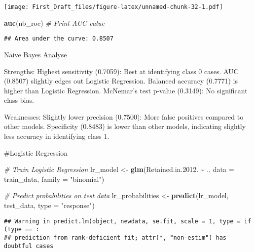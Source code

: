 \documentclass[
]{article}
\newenvironment{Shaded}{\begin{snugshade}}{\end{snugshade}}
\newcommand{\AttributeTok}[1]{\textcolor[rgb]{0.13,0.29,0.53}{#1}}
\newcommand{\CommentTok}[1]{\textcolor[rgb]{0.56,0.35,0.01}{\textit{#1}}}
\newcommand{\DecValTok}[1]{\textcolor[rgb]{0.00,0.00,0.81}{#1}}
\newcommand{\FloatTok}[1]{\textcolor[rgb]{0.00,0.00,0.81}{#1}}
\newcommand{\FunctionTok}[1]{\textcolor[rgb]{0.13,0.29,0.53}{\textbf{#1}}}
\newcommand{\NormalTok}[1]{#1}
\newcommand{\OtherTok}[1]{\textcolor[rgb]{0.56,0.35,0.01}{#1}}
\newcommand{\SpecialCharTok}[1]{\textcolor[rgb]{0.81,0.36,0.00}{\textbf{#1}}}
\newcommand{\StringTok}[1]{\textcolor[rgb]{0.31,0.60,0.02}{#1}}
\begin{document}
\texttt{[image: First\_Draft\_files/figure-latex/unnamed-chunk-32-1.pdf]}

\begin{Shaded}
\begin{Highlighting}[]
\FunctionTok{auc}\NormalTok{(nb\_roc)  }\CommentTok{\# Print AUC value}
\end{Highlighting}
\end{Shaded}

\begin{verbatim}
## Area under the curve: 0.8507
\end{verbatim}

Naive Bayes Analyse

Strengths: Highest sensitivity (0.7059): Best at identifying class 0
cases. AUC (0.8507) slightly edges out Logistic Regression. Balanced
accuracy (0.7771) is higher than Logistic Regression. McNemar's test
p-value (0.3149): No significant class bias.

Weaknesses: Slightly lower precision (0.7500): More false positives
compared to other models. Specificity (0.8483) is lower than other
models, indicating slightly less accuracy in identifying class 1.

\#Logistic Regression

\begin{Shaded}
\begin{Highlighting}[]
\CommentTok{\# Train Logistic Regression}
\NormalTok{lr\_model }\OtherTok{\textless{}{-}} \FunctionTok{glm}\NormalTok{(Retained.in.}\FloatTok{2012.} \SpecialCharTok{\textasciitilde{}}\NormalTok{ ., }\AttributeTok{data =}\NormalTok{ train\_data, }\AttributeTok{family =} \StringTok{"binomial"}\NormalTok{)}

\CommentTok{\# Predict probabilities on test data}
\NormalTok{lr\_probabilities }\OtherTok{\textless{}{-}} \FunctionTok{predict}\NormalTok{(lr\_model, test\_data, }\AttributeTok{type =} \StringTok{"response"}\NormalTok{)}
\end{Highlighting}
\end{Shaded}

\begin{verbatim}
## Warning in predict.lm(object, newdata, se.fit, scale = 1, type = if (type == :
## prediction from rank-deficient fit; attr(*, "non-estim") has doubtful cases
\end{verbatim}

\begin{Shaded}
\end{Shaded}
\end{document}
